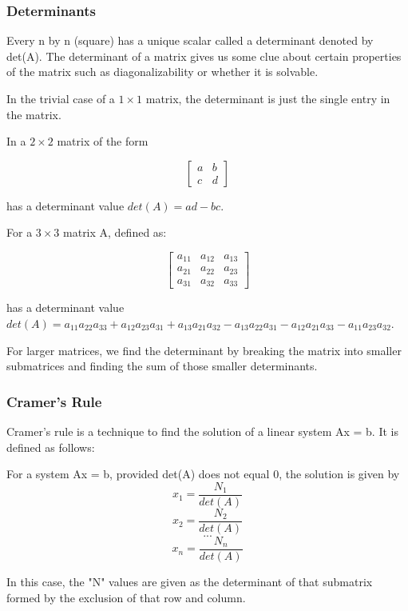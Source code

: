 \subsubsection{Determinants}
Every n by n (square) has a unique scalar called a determinant denoted by det(A).
The determinant of a matrix gives us some clue about certain properties of the matrix such as diagonalizability or whether it is solvable.


In the trivial case of a $1 \times 1$ matrix, the determinant is just the single entry in the matrix.

In a $2 \times 2$ matrix of the form

$$
\begin{bmatrix}
a&b\\
c&d
\end{bmatrix}
$$

has a determinant value $det(A) = ad - bc$.

For a $3 \times 3$ matrix A, defined as:

$$
\begin{bmatrix}
a_{11}&a_{12}&a_{13}\\
a_{21}&a_{22}&a_{23}\\ 
a_{31}&a_{32}&a_{33}
\end{bmatrix}
$$

has a determinant value $det(A) = a_{11}a_{22}a_{33}+a_{12}a_{23}a_{31}+a_{13}a_{21}a_{32}-a_{13}a_{22}a_{31}-a_{12}a_{21}a_{33}-a_{11}a_{23}a_{32}$.

For larger matrices, we find the determinant by breaking the matrix into smaller submatrices and finding the sum of those smaller determinants.

\subsubsection{Cramer's Rule}
Cramer's rule is a technique to find the solution of a linear system Ax = b.
It is defined as follows:

\begin{theorem}
For a system Ax = b, provided det(A) does not equal 0, the solution is given by 
$$x_{1} = \frac{N_{1}}{det(A)}$$
$$x_{2} = \frac{N_{2}}{det(A)}$$
$$...$$
$$x_{n} = \frac{N_{n}}{det(A)}$$
\end{theorem}

In this case, the "N" values are given as the determinant of that submatrix formed by the exclusion of that row and column.